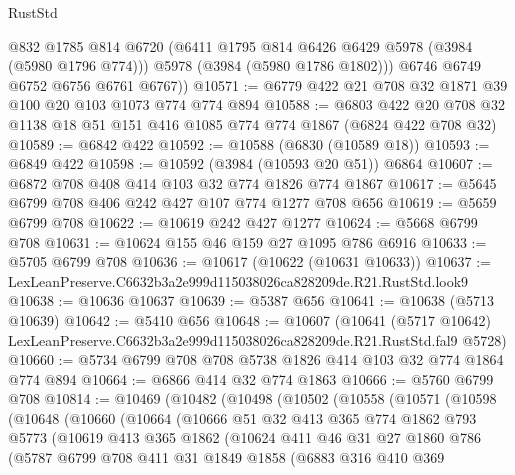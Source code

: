 \begin{lexlean}{RustStd}
\begin{coremodule}
          @832
          @1785
          @814
          @6720
          (@6411 @1795 @814 @6426 @6429 @5978 (@3984 (@5980 @1796 @774)))
          @5978
          (@3984 (@5980 @1786 @1802)))
        @6746
        @6749
        @6752
        @6756
        @6761
        @6767))
@10571 := @6779 @422 @21 @708 @32 @1871 @39 @100 @20 @103 @1073 @774 @774 @894
@10588 := @6803
    @422
    @20
    @708
    @32
    @1138
    @18
    @51
    @151
    @416
    @1085
    @774
    @774
    @1867
    (@6824 @422 @708 @32)
@10589 := @6842 @422
@10592 := @10588 (@6830 (@10589 @18))
@10593 := @6849 @422
@10598 := @10592 (@3984 (@10593 @20 @51)) @6864
@10607 := @6872 @708 @408 @414 @103 @32 @774 @1826 @774 @1867
@10617 := @5645 @6799 @708 @406 @242 @427 @107 @774 @1277 @708 @656
@10619 := @5659 @6799 @708
@10622 := @10619 @242 @427 @1277
@10624 := @5668 @6799 @708
@10631 := @10624 @155 @46 @159 @27 @1095 @786 @6916
@10633 := @5705 @6799 @708
@10636 := @10617 (@10622 (@10631 @10633))
@10637 := LexLeanPreserve.C6632b3a2e999d115038026ca828209de.R21.RustStd.look9
@10638 := @10636 @10637
@10639 := @5387 @656
@10641 := @10638 (@5713 @10639)
@10642 := @5410 @656
@10648 := @10607
    (@10641 (@5717 @10642) LexLeanPreserve.C6632b3a2e999d115038026ca828209de.R21.RustStd.fal9 @5728)
@10660 := @5734 @6799 @708 @708 @5738 @1826 @414 @103 @32 @774 @1864 @774 @894
@10664 := @6866 @414 @32 @774 @1863
@10666 := @5760 @6799 @708
@10814 := @10469
    (@10482
      (@10498
        (@10502
          (@10558
            (@10571
              (@10598
                (@10648
                  (@10660
                    (@10664
                      (@10666
                        @51
                        @32
                        @413
                        @365
                        @774
                        @1862
                        @793
                        @5773
                        (@10619
                          @413
                          @365
                          @1862
                          (@10624
                            @411
                            @46
                            @31
                            @27
                            @1860
                            @786
                            (@5787
                              @6799
                              @708
                              @411
                              @31
                              @1849
                              @1858
                              (@6883
                                @316
                                @410
                                @369

\end{coremodule}
\end{lexlean}
